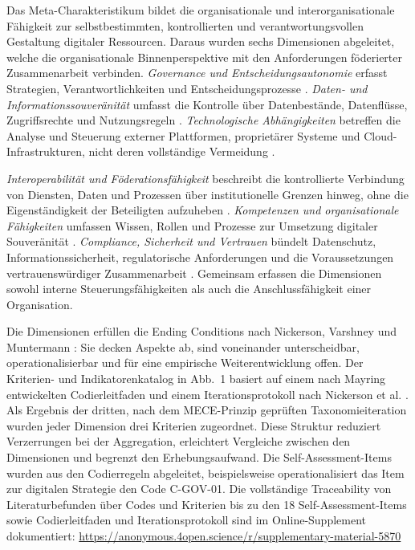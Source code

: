 \documentclass[10pt,a4paper]{article}
\begin{document}
Das Meta-Charakteristikum bildet die organisationale und interorganisationale Fähigkeit zur selbstbestimmten, kontrollierten und verantwortungsvollen Gestaltung digitaler Ressourcen. Daraus wurden sechs Dimensionen abgeleitet, welche die organisationale Binnenperspektive mit den Anforderungen föderierter Zusammenarbeit verbinden. \textit{Governance und Entscheidungsautonomie} erfasst Strategien, Verantwortlichkeiten und Entscheidungsprozesse \cite{PT20,SHO24}. \textit{Daten- und Informationssouveränität} umfasst die Kontrolle über Datenbestände, Datenflüsse, Zugriffsrechte und Nutzungsregeln \cite{Ab24,SHO24,OJ19}. \textit{Technologische Abhängigkeiten} betreffen die Analyse und Steuerung externer Plattformen, proprietärer Systeme und Cloud-Infrastrukturen, nicht deren vollständige Vermeidung \cite{PT20,Fr24,BM24a,BT24}.

\textit{Interoperabilität und Föderationsfähigkeit} beschreibt die kontrollierte Verbindung von Diensten, Daten und Prozessen über institutionelle Grenzen hinweg, ohne die Eigenständigkeit der Beteiligten aufzuheben \cite{OE23,BM24a,Ga23,ID23}. \textit{Kompetenzen und organisationale Fähigkeiten} umfassen Wissen, Rollen und Prozesse zur Umsetzung digitaler Souveränität \cite{PR11,St23}. \textit{Compliance, Sicherheit und Vertrauen} bündelt Datenschutz, Informationssicherheit, regulatorische Anforderungen und die Voraussetzungen vertrauenswürdiger Zusammenarbeit \cite{KDW25,Ze26}. Gemeinsam erfassen die Dimensionen sowohl interne Steuerungsfähigkeiten als auch die Anschlussfähigkeit einer Organisation.

Die Dimensionen erfüllen die Ending Conditions nach Nickerson, Varshney und Muntermann \cite{NVM13}: Sie decken Aspekte ab, sind voneinander unterscheidbar, operationalisierbar und für eine empirische Weiterentwicklung offen. Der Kriterien- und Indikatorenkatalog in Abb.~1 basiert auf einem nach Mayring \cite{Ma14} entwickelten Codierleitfaden und einem Iterationsprotokoll nach Nickerson et al. \cite{NVM13}. Als Ergebnis der dritten, nach dem MECE-Prinzip geprüften Taxonomieiteration wurden jeder Dimension drei Kriterien zugeordnet. Diese Struktur reduziert Verzerrungen bei der Aggregation, erleichtert Vergleiche zwischen den Dimensionen und begrenzt den Erhebungsaufwand. Die Self-Assessment-Items wurden aus den Codierregeln abgeleitet, beispielsweise operationalisiert das Item zur digitalen Strategie den Code C-GOV-01. Die vollständige Traceability von Literaturbefunden über Codes und Kriterien bis zu den 18 Self-Assessment-Items sowie Codierleitfaden und Iterationsprotokoll sind im Online-Supplement dokumentiert:\newline
\url{https://anonymous.4open.science/r/supplementary-material-5870}
\end{document}
